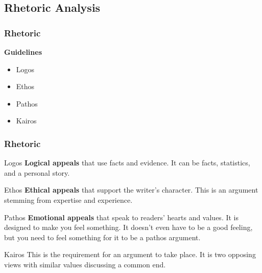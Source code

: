 \documentclass{beamer}
\begin{document}
\subsection{Rhetoric Analysis}
\begin{frame}
\frametitle{Rhetoric}
\textbf{Guidelines}
\begin{itemize}
\item Logos
\item Ethos
\item Pathos
\item Kairos
\end{itemize}
\end{frame}
\begin{frame}
\frametitle{Rhetoric}
\begin{block}{Logos}
\textbf{Logical appeals} that use facts and evidence. It can be facts, statistics, and a personal story.
\end{block}

\begin{block}{Ethos}
\textbf{Ethical appeals} that support the writer's character. This is an argument stemming from expertise and experience.
\end{block}

\begin{block}{Pathos}
\textbf{Emotional appeals} that speak to readers’ hearts and values. It is designed to make you feel something. It doesn't even have to be a good feeling, but you need to feel something for it to be a pathos argument.
\end{block}

\begin{block}{Kairos}
This is the requirement for an argument to take place. It is two opposing views with similar values discussing a common end.
\end{block}
\end{frame}
\end{document}
